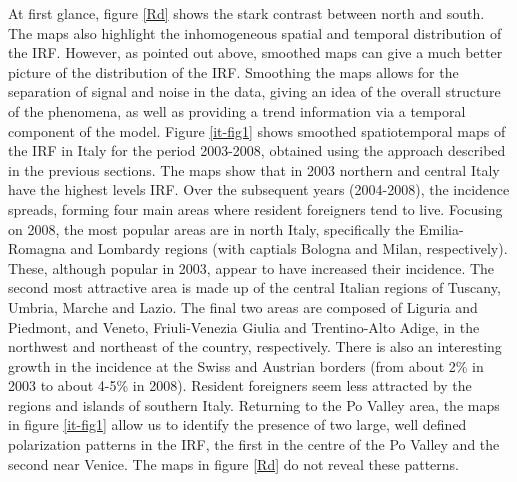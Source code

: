 At first glance, figure \ref{Rd} shows the stark contrast between north and south. The maps also highlight the inhomogeneous spatial and temporal distribution of the IRF. However, as pointed out above, smoothed maps can give a much better picture of the distribution of the IRF. Smoothing the maps allows for the separation of signal and noise in the data, giving an idea of the overall structure of the phenomena, as well as providing a trend information via a temporal component of the model. Figure \ref{it-fig1} shows smoothed spatiotemporal maps of the IRF in Italy for the period 2003-2008, obtained using the approach described in the previous sections. The maps show that in 2003 northern and central Italy have the highest levels IRF. Over the subsequent years (2004-2008), the incidence spreads, forming four main areas where resident foreigners tend to live. Focusing on 2008, the most popular areas are in north Italy, specifically the Emilia-Romagna and Lombardy regions (with captials Bologna and Milan, respectively). These, although popular in 2003, appear to have increased their incidence. The second most attractive area is made up of the central Italian regions of Tuscany, Umbria, Marche and Lazio. The final two areas are composed of Liguria and Piedmont, and Veneto, Friuli-Venezia Giulia and Trentino-Alto Adige, in the northwest and northeast of the country, respectively. There is also an interesting growth in the incidence at the Swiss and Austrian borders (from about 2\% in 2003 to about 4-5\% in 2008). Resident foreigners seem less attracted by the regions and islands of southern Italy. Returning to the Po Valley area, the maps in figure \ref{it-fig1} allow us to identify the presence of two large, well defined polarization patterns in the IRF, the first in the centre of the Po Valley and the second near Venice. The maps in figure \ref{Rd} do not reveal these patterns.

